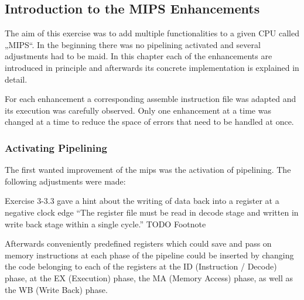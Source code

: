 


\subsection{Introduction to the MIPS Enhancements}
\label{sec:introductionToEnhancements}

The aim of this exercise was to add multiple functionalities to a given CPU called „MIPS“. In the beginning there was no pipelining activated and several adjustments had to be maid. In this chapter each of the enhancements are introduced in principle and afterwards its concrete implementation is explained in detail.

For each enhancement a corresponding assemble instruction file was adapted and its execution was carefully observed. Only one enhancement at a time was changed at a time to reduce the space of errors that need to be handled at once.


\subsubsection{Activating Pipelining}
\label{sec:activatingPipelining}
The first wanted improvement of the mips was the activation of pipelining. The following adjustments were made:

Exercise 3-3.3 gave a hint about the writing of data back into a register at a negative clock edge ``The register file must be read in decode stage and written in write back stage within a single cycle.'' TODO Footnote



Afterwards conveniently predefined registers which could save and pass on memory instructions at each phase of the pipeline could be inserted by changing the code belonging to each of the registers at the ID (Instruction / Decode) phase, at the EX (Execution) phase, the MA (Memory Access) phase, as well as the WB (Write Back) phase.



